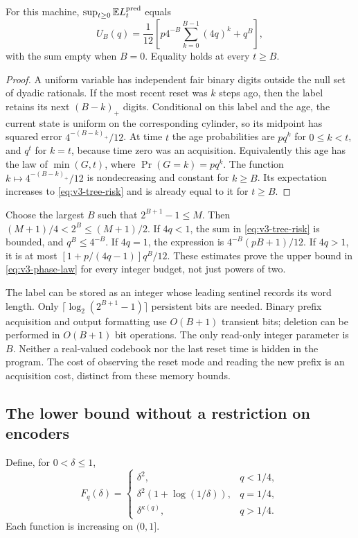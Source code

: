 \begin{lemma}\label{lem:v3-tree}
For this machine, $\sup_{t\ge0}\mathbb E L_t^{\rm pred}$ equals
\begin{equation}\label{eq:v3-tree-risk}
 U_B(q)=\frac1{12}\left[
 p4^{-B}\sum_{k=0}^{B-1}(4q)^k+q^B\right],
\end{equation}
with the sum empty when $B=0$. Equality holds at every $t\ge B$.
\end{lemma}
\begin{proof}
A uniform variable has independent fair binary digits outside the null
set of dyadic rationals. If the most recent reset was $k$ steps ago,
then the label retains its next $(B-k)_+$ digits. Conditional on this
label and the age, the current state is uniform on the corresponding
cylinder, so its midpoint has squared error
$4^{-(B-k)_+}/12$. At time $t$ the age probabilities are $pq^k$ for
$0\le k<t$, and $q^t$ for $k=t$, because time zero was an acquisition.
Equivalently this age has the law of $\min(G,t)$, where
$\Pr(G=k)=pq^k$. The function $k\mapsto4^{-(B-k)_+}/12$ is
nondecreasing and constant for $k\ge B$. Its expectation increases to
\eqref{eq:v3-tree-risk} and is already equal to it for $t\ge B$.
\end{proof}

Choose the largest $B$ such that $2^{B+1}-1\le M$. Then
$(M+1)/4<2^B\le(M+1)/2$. If $4q<1$, the sum in
\eqref{eq:v3-tree-risk} is bounded, and $q^B\le4^{-B}$.
If $4q=1$, the expression is $4^{-B}(pB+1)/12$.
If $4q>1$, it is at most
$[1+p/(4q-1)]q^B/12$.
These estimates prove the upper bound in \eqref{eq:v3-phase-law}
for every integer budget, not just powers of two.

The label can be stored as an integer whose leading sentinel records its
word length. Only $\lceil\log_2(2^{B+1}-1)\rceil$ persistent bits are
needed. Binary prefix acquisition and output formatting use $O(B+1)$
transient bits; deletion can be performed in $O(B+1)$ bit operations.
The only read-only integer parameter is $B$. Neither a real-valued
codebook nor the last reset time is hidden in the program. The cost of
observing the reset mode and reading the new prefix is an acquisition
cost, distinct from these memory bounds.

\subsection{The lower bound without a restriction on encoders}
Define, for $0<\delta\le1$,
\[
 F_q(\delta)=
 \begin{cases}
 \delta^2,&q<1/4,\\
 \delta^2(1+\log(1/\delta)),&q=1/4,\\
 \delta^{\kappa(q)},&q>1/4.
 \end{cases}
\]
Each function is increasing on $(0,1]$.

